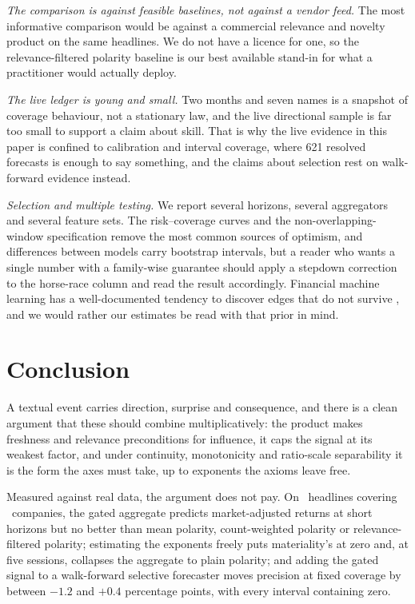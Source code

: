 \emph{The comparison is against feasible baselines, not against a vendor feed.}
The most informative comparison would be against a commercial relevance and
novelty product on the same headlines. We do not have a licence for one, so the
relevance-filtered polarity baseline is our best available stand-in for what a
practitioner would actually deploy.

\emph{The live ledger is young and small.} Two months and seven names is a
snapshot of coverage behaviour, not a stationary law, and the live directional
sample is far too small to support a claim about skill. That is why the live
evidence in this paper is confined to calibration and interval coverage, where
621 resolved forecasts is enough to say something, and the claims about selection
rest on walk-forward evidence instead.

\emph{Selection and multiple testing.} We report several horizons, several
aggregators and several feature sets. The risk--coverage curves and the
non-overlapping-window specification remove the most common sources of
optimism, and differences between models carry bootstrap intervals, but a reader
who wants a single number with a family-wise guarantee should apply a stepdown
correction \citep{romano2005} to the horse-race column and read the result
accordingly. Financial machine learning has a well-documented tendency to
discover edges that do not survive \citep{bailey2017,harvey2016}, and we would
rather our estimates be read with that prior in mind.

\section{Conclusion}\label{sec:conclusion}

A textual event carries direction, surprise and consequence, and there is a clean
argument that these should combine multiplicatively: the product makes freshness
and relevance preconditions for influence, it caps the signal at its weakest
factor, and under continuity, monotonicity and ratio-scale separability it is the
form the axes must take, up to exponents the axioms leave free.

Measured against real data, the argument does not pay. On \ScoredHeadlines\
headlines covering \NCompanies\ companies, the gated aggregate predicts
market-adjusted returns at short horizons but no better than mean polarity,
count-weighted polarity or relevance-filtered polarity; estimating the exponents
freely puts materiality's at zero and, at five sessions, collapses the aggregate
to plain polarity; and adding the gated signal to a walk-forward selective
forecaster moves precision at fixed coverage by between $-1.2$ and $+0.4$
percentage points, with every interval containing zero.

